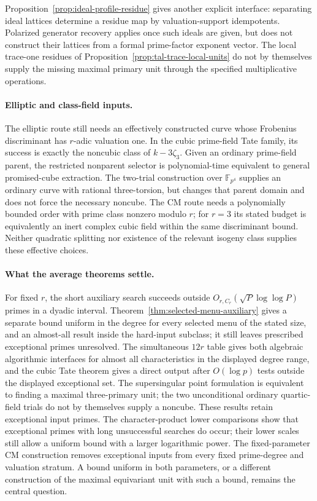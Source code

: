 \documentclass[11pt]{article}
\theoremstyle{definition}
\theoremstyle{remark}
\begin{document}
Proposition~\ref{prop:ideal-profile-residue} gives another explicit
interface: separating ideal lattices determine a residue map by
valuation-support idempotents. Polarized generator recovery applies
once such ideals are given, but does not construct their lattices
from a formal prime-factor exponent vector. The local trace-one
residues of Proposition~\ref{prop:tal-trace-local-units} do not by
themselves supply the missing maximal primary unit through the
specified multiplicative operations.

\paragraph{Elliptic and class-field inputs.}
The elliptic route still needs an effectively constructed curve whose Frobenius discriminant has $r$-adic valuation one. In the cubic prime-field Tate family, its success is exactly the noncubic class of $k-3\zeta_3$. Given an ordinary prime-field parent, the restricted nonparent selector is polynomial-time equivalent to general promised-cube extraction. The two-trial construction over $\mathbb F_{p^4}$ supplies an ordinary curve with rational three-torsion, but changes that parent domain and does not force the necessary noncube. The CM route needs a polynomially bounded order with prime class nonzero modulo $r$; for $r=3$ its stated budget is equivalently an inert complex cubic field within the same discriminant bound. Neither quadratic splitting nor existence of the relevant isogeny class supplies these effective choices.

\paragraph{What the average theorems settle.}
For fixed $r$, the short auxiliary search succeeds outside $O_{r,C_r}(\sqrt P\log\log P)$ primes in a dyadic interval. Theorem~\ref{thm:selected-menu-auxiliary} gives a separate bound uniform in the degree for every selected menu of the stated size, and an almost-all result inside the hard-input subclass; it still leaves prescribed exceptional primes unresolved. The simultaneous $12r$ table gives both algebraic algorithmic interfaces for almost all characteristics in the displayed degree range, and the cubic Tate theorem gives a direct output after $O(\log p)$ tests outside the displayed exceptional set. The supersingular point formulation is equivalent to finding a maximal three-primary unit; the two unconditional ordinary quartic-field trials do not by themselves supply a noncube. These results retain exceptional input primes. The character-product lower comparisons show that exceptional primes with long unsuccessful searches do occur; their lower scales still allow a uniform bound with a larger logarithmic power. The fixed-parameter CM construction removes exceptional inputs from every fixed prime-degree and valuation stratum. A bound uniform in both parameters, or a different construction of the maximal equivariant unit with such a bound, remains the central question.
\end{document}

